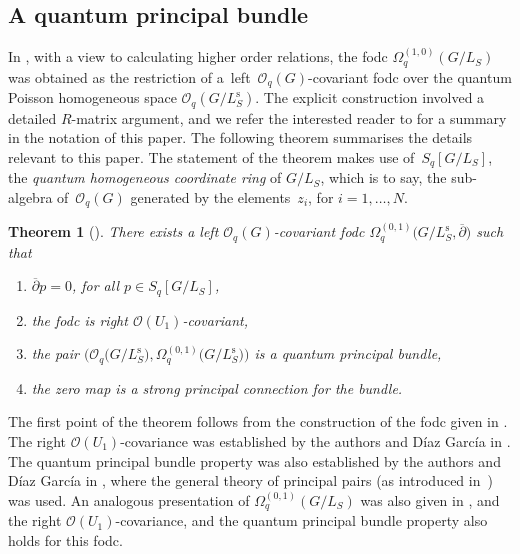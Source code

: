 \documentclass[pdftex]{sigma}
\numberwithin{equation}{section}
\newtheorem{Theorem}{Theorem}[section]
\newcommand\adel{\overline{\partial}}
\begin{document}
\subsection{A quantum principal bundle} \label{subsection:QPB}

In \cite{HKdR}, with a view to calculating higher order relations, the fodc $\Omega^{(1,0)}_q(G/L_S)$ was obtained as the restriction of a~left~$\mathcal{O}_q(G)$-covariant fodc over the quantum Poisson homogeneous space $\mathcal{O}_q(G/L^{\mathrm{s}}_S)$. The explicit construction involved a detailed $R$-matrix argument, and we refer the interested reader to \cite{CDOBBW} for a summary in the notation of this paper. The following theorem summarises the details relevant to this paper. The statement of the theorem makes use of~$S_q[G/L_S]$, the \emph{quantum homogeneous coordinate ring} of $G/L_S$, which is to say, the sub-algebra of~$\mathcal{O}_q(G)$ generated by the elements~$z_i$, for $i=1, \dots, N$.

\begin{Theorem}[{\cite[Section~3.2]{HKdR}}]
There exists a left $\mathcal{O}_q(G)$-covariant fodc
$\Omega^{(0,1)}_q\big(G/L^{\mathrm{s}}_S,\adel\big)$
such that
\begin{enumerate}\itemsep=0pt
\item[$(1)$] $\adel p = 0$, for all $p \in S_q[G/L_S]$,
\item[$(2)$] the fodc is right $\mathcal{O}(U_1)$-covariant,
\item[$(3)$] the pair $\big(\mathcal{O}_q\big(G/L^{\mathrm{s}}_S\big),   \Omega^{(0,1)}_q\big(G/L^{\mathrm{s}}_S\big)\big)$ is a quantum principal bundle,
\item[$(4)$] the zero map is a strong principal connection for the bundle.
\end{enumerate}
\end{Theorem}

The first point of the theorem follows from the construction of the fodc given in \cite[Section~3.2]{HKdR}. The right $\mathcal{O}(U_1)$-covariance was established by the authors and D\'iaz Garc\'ia in \cite[Lemma~5.5]{CDOBBW}. The quantum principal bundle property was also established by the authors and D\'iaz Garc\'ia in \cite[Proposition~5.6]{CDOBBW}, where the general theory of principal pairs (as introduced in~\cite{BwGrass,GAPP}) was used. An analogous presentation of $\Omega^{(0,1)}_q(G/L_S)$ was also given in \cite[Section~3.2]{HKdR}, and the right $\mathcal{O}(U_1)$-covariance, and the quantum principal bundle property also holds for this fodc.
\end{document}

